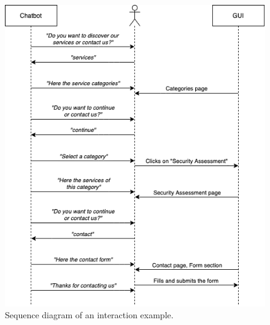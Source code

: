 \documentclass[12pt]{report}
\begin{document}
\begin{figure}[h]
	\centering
	\includegraphics[width=\textwidth]{sequence-diagram}
	\caption{Sequence diagram of an interaction example.}
	\label{fig:sequence-diagram}
\end{figure}
\end{document}
